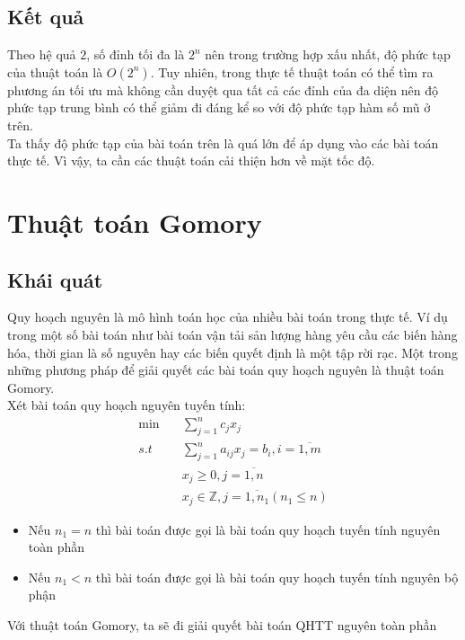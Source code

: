 \documentclass[12pt,a4paper]{article}\author{Nguyễn Nho Dũng}
\let\svsection\section
\def\section{\setcounter{figure}{0}\svsection}
\newcommand{\ngoacto}[1]{\left(#1\right)}
\newcommand{\tonglanluot}[2]{\sum_{#1}^{#2}}
\begin{document}
\begin{thuattoan}
\begin{itemize}
\begin{itemize}
		\end{itemize}
	\end{itemize}
\end{thuattoan}
\subsection{Kết quả}
Theo hệ quả $2$, số đỉnh tối đa là $2^n$ nên trong trường hợp xấu nhất, độ phức tạp của thuật toán là $O\ngoacto{2^n}$. Tuy nhiên, trong thực tế thuật toán có thể tìm ra phương án tối ưu mà không cần duyệt qua tất cả các đỉnh của đa diện nên độ phức tạp trung bình có thể giảm đi đáng kể so với độ phức tạp hàm số mũ ở trên.\\
Ta thấy độ phức tạp của bài toán trên là quá lớn để áp dụng vào các bài toán thực tế. Vì vậy, ta cần các thuật toán cải thiện hơn về mặt tốc độ.

\newpage\section{ Thuật toán Gomory}
\subsection{Khái quát}
Quy hoạch nguyên là mô hình toán học của nhiều bài toán trong thực tế. Ví dụ trong một số bài toán như bài toán vận tải sản lượng hàng yêu cầu các biến hàng hóa, thời gian là số nguyên hay các biến quyết định là một tập rời rạc. Một trong những phương pháp để giải quyết các bài toán quy hoạch nguyên là thuật toán Gomory.\\

Xét bài toán quy hoạch nguyên tuyến tính: 
\begin{align}
	\min\quad &\tonglanluot{j=1}{n} c_j x_j \\
	s.t\quad &\tonglanluot{j=1}{n} a_{ij} x_j = b_i, i=\overline{1,m}\\
	& x_j \ge 0, j = \overline{1,n}\\
	& x_j \in \mathbb{Z}, j = \overline{1, n_1} (n_1 \le n)
\end{align}
\begin{itemize}
	\item Nếu $n_1 = n$ thì bài toán được gọi là bài toán quy hoạch tuyến tính nguyên toàn phần
	\item Nếu $n_1 < n$ thì bài toán được gọi là bài toán quy hoạch tuyến tính nguyên bộ phận 
\end{itemize}

Với thuật toán Gomory, ta sẽ đi giải quyết bài toán QHTT nguyên toàn phần
\end{document}
